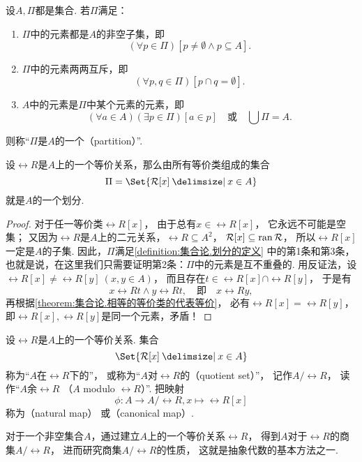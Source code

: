\begin{definition}\label{definition:集合论.划分的定义}
设\(A,\Pi\)都是集合.
若\(\Pi\)满足：
\begin{enumerate}
	\item \(\Pi\)中的元素都是\(A\)的非空子集，即\[
		(\forall p \in \Pi)
		[
			p \neq \emptyset
			\land
			p \subseteq A
		].
	\]

	\item \(\Pi\)中的元素两两互斥，即\[
		(\forall p,q \in \Pi)[p \cap q = \emptyset].
	\]

	\item \(A\)中的元素是\(\Pi\)中某个元素的元素，即\[
		(\forall a \in A)
		(\exists p \in \Pi)
		[a \in p]
		\quad\text{或}\quad
		\bigcup\Pi = A.
	\]
\end{enumerate}
则称“\(\Pi\)是\(A\)的一个（partition）”.
\end{definition}

\begin{theorem}
设\(\rel{R}\)是\(A\)上的一个等价关系，那么由所有等价类组成的集合\[
	\Pi = \Set{ \rel{R}[x] \given x \in A }
\]就是\(A\)的一个划分.
\begin{proof}
对于任一等价类\(\rel{R}[x]\)，
由于总有\(x \in \rel{R}[x]\)，
它永远不可能是空集；
又因为\(\rel{R}\)是\(A\)上的二元关系，\(\rel{R} \subseteq A^2\)，
\(\mathcal{R}[x] \subseteq \operatorname{ran} \mathcal{R}\)，
所以\(\rel{R}[x]\)一定是\(A\)的子集.
因此，\(\Pi\)满足\cref{definition:集合论.划分的定义} 中的第1条和第3条，
也就是说，在这里我们只需要证明第2条：\(\Pi\)中的元素是互不重叠的.
用反证法，设\(\rel{R}[x] \neq \rel{R}[y]\ (x,y \in A)\)，
而且存在\(t \in \rel{R}[x] \cap \rel{R}[y]\)，
于是有\[
	x \rel{R} t \land y \rel{R} t,
	\quad\text{即}\quad
	x \rel{R} y,
\]
再根据\cref{theorem:集合论.相等的等价类的代表等价}，
必有\(\rel{R}[x] = \rel{R}[y]\)，
即\(\rel{R}[x],\rel{R}[y]\)是同一个元素，矛盾！
\end{proof}
\end{theorem}

\begin{definition}
设\(\rel{R}\)是\(A\)上的一个等价关系.
集合\[
	\Set{ \rel{R}[x] \given x \in A }
\]称为“\(A\)在\(\rel{R}\)下的”，
或称为“\(A\)对\(\rel{R}\)的（quotient set）”，
记作\(A/\rel{R}\)，
读作“\(A\)余\(\rel{R}\)
（\(A\) modulo \(\rel{R}\)）”.
把映射\[
	\phi\colon A \to A/\rel{R}, x \mapsto \rel{R}[x]
\]称为（natural map）%
或（canonical map）.
\end{definition}
对于一个非空集合\(A\)，通过建立\(A\)上的一个等价关系\(\rel{R}\)，
得到\(A\)对于\(\rel{R}\)的商集\(A/\rel{R}\)，
进而研究商集\(A/\rel{R}\)的性质，
这就是抽象代数的基本方法之一.

